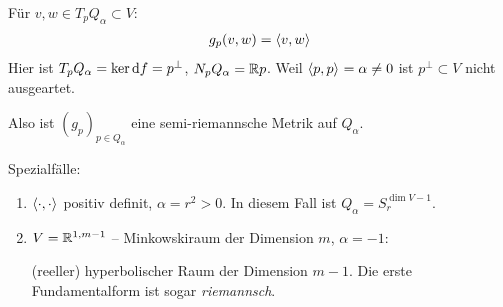 \documentclass{skript}
\begin{document}
\begin{bsps}
\begin{enumerate}
      Für $v,w\in T_pQ_\alpha \subset V$:
      \begin{align*}
        g_p(v,w) = \sprod{v,w}
      \end{align*}
      Hier ist $T_pQ_\alpha = \operatorname{ker} \mathrm d f = p^\perp$, $N_pQ_\alpha =
      \mathbb{R} p$. Weil $\sprod{p,p} = \alpha \ne 0$ ist $p^\perp \subset V$ nicht
      ausgeartet.

      Also ist $(g_p)_{p\in Q_\alpha}$ eine semi-riemannsche Metrik auf
      $Q_\alpha$.

      Spezialfälle:
      \begin{enumerate}
        \item $\sprod{\cdot, \cdot}$ positiv definit, $\alpha = r^2 > 0$. In
          diesem Fall ist $Q_\alpha = S_r^{\operatorname{dim} V - 1}$.
        \item $V=\mathbb{R}^{1,m-1}$ -- Minkowskiraum der Dimension $m$, $\alpha = -1$:

          (reeller) hyperbolischer Raum der Dimension $m-1$. Die erste
          Fundamentalform ist sogar \emph{riemannsch}.
      \end{enumerate}
  \end{enumerate}
\end{bsps}
\end{document}
